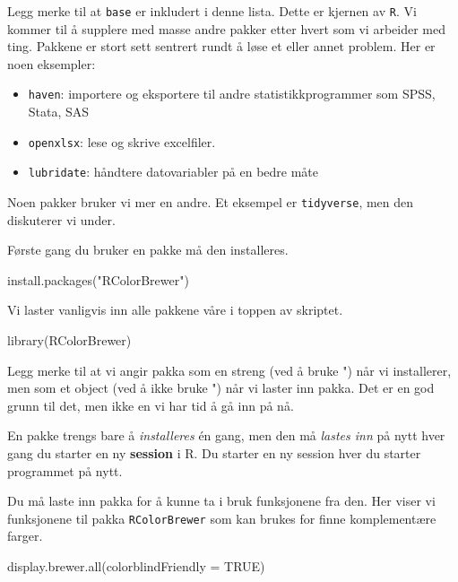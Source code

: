\documentclass[
  letterpaper,
  DIV=11,
  numbers=noendperiod]{scrreprt}
\newenvironment{Shaded}{\begin{snugshade}}{\end{snugshade}}
\newcommand{\AttributeTok}[1]{\textcolor[rgb]{0.40,0.45,0.13}{#1}}
\newcommand{\ConstantTok}[1]{\textcolor[rgb]{0.56,0.35,0.01}{#1}}
\newcommand{\FunctionTok}[1]{\textcolor[rgb]{0.28,0.35,0.67}{#1}}
\newcommand{\NormalTok}[1]{\textcolor[rgb]{0.00,0.23,0.31}{#1}}
\newcommand{\StringTok}[1]{\textcolor[rgb]{0.13,0.47,0.30}{#1}}
\providecommand{\tightlist}{%
  \setlength{\itemsep}{0pt}\setlength{\parskip}{0pt}}\usepackage{longtable,booktabs,array}
\begin{document}
Legg merke til at \texttt{base} er inkludert i denne lista. Dette er
kjernen av \texttt{R}. Vi kommer til å supplere med masse andre pakker
etter hvert som vi arbeider med ting. Pakkene er stort sett sentrert
rundt å løse et eller annet problem. Her er noen eksempler:

\begin{itemize}
\tightlist
\item
  \texttt{haven}: importere og eksportere til andre statistikkprogrammer
  som SPSS, Stata, SAS
\item
  \texttt{openxlsx}: lese og skrive excelfiler.
\item
  \texttt{lubridate}: håndtere datovariabler på en bedre måte
\end{itemize}

Noen pakker bruker vi mer en andre. Et eksempel er \texttt{tidyverse},
men den diskuterer vi under.

Første gang du bruker en pakke må den installeres.

\begin{Shaded}
\begin{Highlighting}[]
\FunctionTok{install.packages}\NormalTok{(}\StringTok{"RColorBrewer"}\NormalTok{)}
\end{Highlighting}
\end{Shaded}

Vi laster vanligvis inn alle pakkene våre i toppen av skriptet.

\begin{Shaded}
\begin{Highlighting}[]
\FunctionTok{library}\NormalTok{(RColorBrewer)}
\end{Highlighting}
\end{Shaded}

Legg merke til at vi angir pakka som en streng (ved å bruke ") når vi
installerer, men som et object (ved å ikke bruke ") når vi laster inn
pakka. Det er en god grunn til det, men ikke en vi har tid å gå inn på
nå.

En pakke trengs bare å \emph{installeres} én gang, men den må
\emph{lastes inn} på nytt hver gang du starter en ny \textbf{session} i
R. Du starter en ny session hver du starter programmet på nytt.

Du må laste inn pakka for å kunne ta i bruk funksjonene fra den. Her
viser vi funksjonene til pakka \texttt{RColorBrewer} som kan brukes for
finne komplementære farger.

\begin{Shaded}
\begin{Highlighting}[]
\FunctionTok{display.brewer.all}\NormalTok{(}\AttributeTok{colorblindFriendly =} \ConstantTok{TRUE}\NormalTok{)}
\end{Highlighting}
\end{Shaded}
\end{document}
